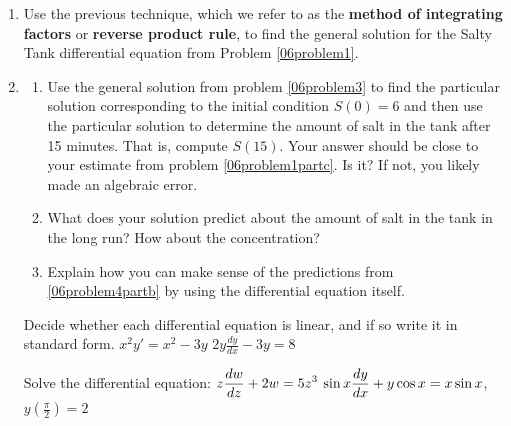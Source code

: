 \begin{enumerate}[resume]
\clearpage

\item	Use the previous technique, which we refer to as the \textbf{method of integrating factors} or \textbf{reverse product rule}, to find the general solution for the Salty Tank differential equation from Problem \ref{06problem1}. \label{06problem3}
\vfill 


\item \label{06problem4}
\begin{enumerate}
\item Use the general solution from problem \ref{06problem3} to find the particular solution corresponding to the initial condition $S(0) = 6$ and then use the particular solution to determine the amount of salt in the tank after 15 minutes. That is, compute $S(15)$. Your answer should be close to your estimate from problem \ref{06problem1partc}. Is it? If not, you likely made an algebraic error. \label{06problem4parta}
\vfill
\item What does your solution predict about the amount of salt in the tank in the long run?  How about the concentration? \label{06problem4partb}
\vfill
\item Explain how you can make sense of the predictions from \ref{06problem4partb} by using the differential equation itself. \label{06problem4partc}
\vfill
\end{enumerate}


\clearpage


\ii Decide whether each differential equation is linear, and if so write it in standard form.
\bb
\ii $x^2y'=x^2-3y$ \vspace{1in}
\ii $2y \frac{dy}{dx} - 3y=8$ \vspace{1in}
\ee

\ii Solve the differential equation:
\bb
\ii $\displaystyle z\frac{dw}{dz}+2w=5z^3$  \vfill %
\ii $\displaystyle \sin{x} \frac{dy}{dx} + y \cos{x} = x\sin{x}$, $y \left( \frac{\pi}{2} \right)=2$  \vfill %
\ee


\end{enumerate}
